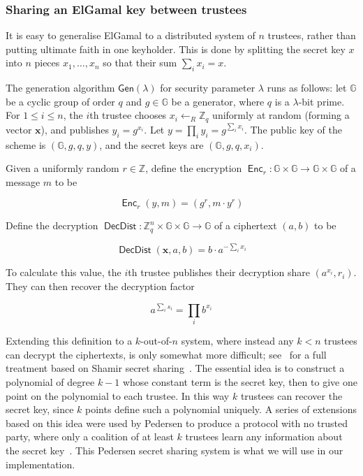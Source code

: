 \documentclass[12pt,a4paper]{article}
\DeclareMathOperator{\Enc}{\mathsf{Enc}}
\DeclareMathOperator{\DecDist}{\mathsf{DecDist}}
\theoremstyle{definition}
\begin{document}
\subsubsection{Sharing an ElGamal key between trustees}
It is easy to generalise ElGamal to a distributed system of $n$ trustees, rather than putting ultimate faith in one keyholder. This is done by splitting the secret key $x$ into $n$ pieces $x_1, \ldots, x_n$ so that their sum $\sum_i x_i = x$.
\begin{definition}
    The generation algorithm $\mathsf{Gen}(\lambda)$ for security parameter $\lambda$ runs as follows: let $\mathbb{G}$ be a cyclic group of order $q$ and $g\in\mathbb{G}$ be a generator, where $q$ is a $\lambda$-bit prime. For $1\leq i\leq n$, the $i$th trustee chooses $x_i\gets_R\mathbb{Z}_q$ uniformly at random (forming a vector $\mathbf{x}$), and publishes $y_i=g^{x_i}$. Let $y=\prod_i y_i=g^{\sum_i x_i}$. The public key of the scheme is $(\mathbb{G}, g, q, y)$, and the secret keys are $(\mathbb{G}, g, q, x_i)$.

    Given a uniformly random $r\in\mathbb{Z}$, define the encryption $\Enc_r:\mathbb{G}\times\mathbb{G}\rightarrow\mathbb{G}\times\mathbb{G}$ of a message $m$ to be
    
    $$\Enc_r(y, m) = (g^r, m\cdot y^r)$$

    Define the decryption $\DecDist:\mathbb{Z}_q^n\times\mathbb{G}\times\mathbb{G}\rightarrow \mathbb{G}$ of a ciphertext $(a, b)$ to be
    
    $$\DecDist(\mathbf{x}, a, b)=b\cdot a^{-\sum_i x_i}$$
    
    To calculate this value, the $i$th trustee publishes their decryption share $\left(a^{x_i}, r_i\right)$. They can then recover the decryption factor
    
    $$a^{\sum_i s_i}=\prod_i{b^{x_i}}$$
\end{definition}

Extending this definition to a $k$-out-of-$n$ system, where instead any $k<n$ trustees can decrypt the ciphertexts, is only somewhat more difficult; see~\cite{pedersen1991threshold} for a full treatment based on Shamir secret sharing~\cite{shamir1979share}. The essential idea is to construct a polynomial of degree $k-1$ whose constant term is the secret key, then to give one point on the polynomial to each trustee. In this way $k$ trustees can recover the secret key, since $k$ points define such a polynomial uniquely. A series of extensions based on this idea were used by Pedersen to produce a protocol with no trusted party, where only a coalition of at least $k$ trustees learn any information about the secret key~\cite{pedersen1991threshold}. This Pedersen secret sharing system is what we will use in our implementation.
\end{document}
